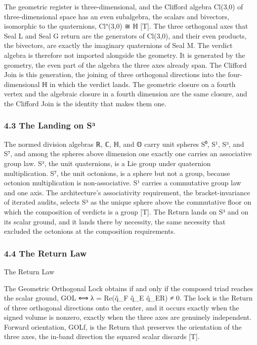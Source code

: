 \documentclass[10pt,twocolumn]{article}
\begin{document}
The geometric register is three-dimensional, and the Clifford algebra
Cl(3,0) of three-dimensional space has an even subalgebra, the scalars
and bivectors, isomorphic to the quaternions, Cl⁺(3,0) ≅ ℍ {[}T{]}. The
three orthogonal axes that Seal L and Seal G return are the generators
of Cl(3,0), and their even products, the bivectors, are exactly the
imaginary quaternions of Seal M. The verdict algebra is therefore not
imported alongside the geometry. It is generated by the geometry, the
even part of the algebra the three axes already span. The Clifford Join
is this generation, the joining of three orthogonal directions into the
four-dimensional ℍ in which the verdict lands. The geometric closure on
a fourth vertex and the algebraic closure in a fourth dimension are the
same closure, and the Clifford Join is the identity that makes them one.

\hypertarget{the-landing-on-suxb3}{%
\subsubsection{4.3 The Landing on S³}\label{the-landing-on-suxb3}}

The normed division algebras ℝ, ℂ, ℍ, and 𝕆 carry unit spheres S⁰, S¹,
S³, and S⁷, and among the spheres above dimension one exactly one
carries an associative group law. S³, the unit quaternions, is a Lie
group under quaternion multiplication. S⁷, the unit octonions, is a
sphere but not a group, because octonion multiplication is
non-associative. S¹ carries a commutative group law and one axis. The
architecture's associativity requirement, the bracket-invariance of
iterated audits, selects S³ as the unique sphere above the commutative
floor on which the composition of verdicts is a group {[}T{]}. The
Return lands on S³ and on its scalar ground, and it lands there by
necessity, the same necessity that excluded the octonions at the
composition requirements.

\hypertarget{the-return-law}{%
\subsubsection{4.4 The Return Law}\label{the-return-law}}

\begin{jbox}{The Return Law}

The Geometric Orthogonal Lock obtains if and only if the composed triad
reaches the scalar ground, GOL ⟺ λ = Re(q̂\_F q̂\_E q̂\_ER) ≠ 0. The lock
is the Return of three orthogonal directions onto the center, and it
occurs exactly when the signed volume is nonzero, exactly when the three
axes are genuinely independent. Forward orientation, GOLf, is the Return
that preserves the orientation of the three axes, the in-band direction
the squared scalar discards {[}T{]}.

\end{jbox}
\end{document}
